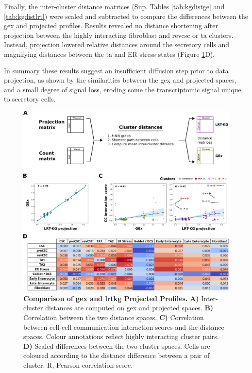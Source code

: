 Finally, the inter-cluster distance matrices (Sup. Tables \ref{tab:kgdistge} and \ref{tab:kgdistlrt}) were scaled and subtracted to compare the differences between the \acrshort{gex} and projected profiles. Results revealed no distance shortening after projection between the highly interacting fibroblast and \acrshort{revcsc} or \acrshort{ta} clusters. Instead, projection lowered relative distances around the secretory cells and magnifying distances between the \acrshort{ta} and ER stress states (Figure \ref{fig:6bench}D).

In summary these results suggest an insufficient diffusion step prior to data projection, as shown by the similarities between the \acrshort{gex} and projected spaces, and a small degree of signal loss, eroding some the transcriptomic signal unique to secretory cells.

\begin{figure}
    \centering
    \includegraphics{06kg/figs/6KG_bench.png}
    \caption{\textbf{Comparison of \acrshort{gex} and \acrshort{lrtkg} Projected Profiles.} \textbf{A)} Inter-cluster distances are computed on \acrshort{gex} and projected spaces. \textbf{B)} Correlation between the two distance spaces. \textbf{C)} Correlation between cell-cell communication interaction scores and the distance spaces. Colour annotations reflect highly interacting cluster pairs. \textbf{D)} Scaled differences between the two cluster spaces. Cells are coloured according to the distance difference between a pair of cluster. R, Pearson correlation score.}
    \label{fig:6bench}
\end{figure}

